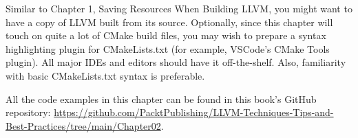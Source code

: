 Similar to Chapter 1, Saving Resources When Building LLVM, you might want to have a copy of LLVM built from its source. Optionally, since this chapter will touch on quite a lot of CMake build files, you may wish to prepare a syntax highlighting plugin for CMakeLists.txt (for example, VSCode's CMake Tools plugin). All major IDEs and editors should have it off-the-shelf. Also, familiarity with basic CMakeLists.txt syntax is preferable.

All the code examples in this chapter can be found in this book's GitHub repository: \url{https://github.com/PacktPublishing/LLVM-Techniques-Tips-and-Best-Practices/tree/main/Chapter02}.